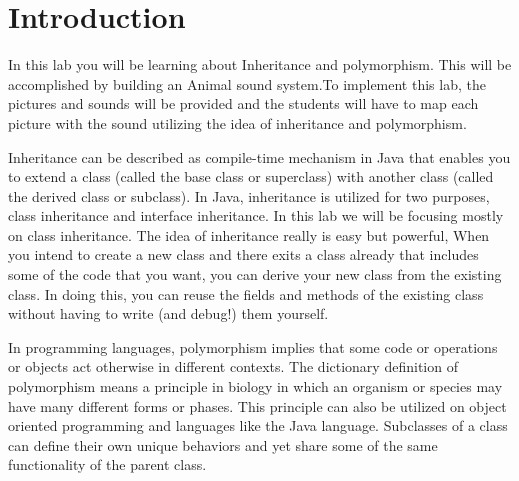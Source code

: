 \section{Introduction}

In this lab you will be learning about Inheritance and polymorphism. This will be accomplished by building an Animal sound system.To implement this lab, the pictures and sounds will be provided and the students will have to map each picture with the sound utilizing the idea of inheritance and polymorphism. 
\begin{flushleft}
Inheritance can be described as compile-time mechanism in Java that enables you to extend a class (called the base class or superclass) with another class (called the derived class or subclass). In Java, inheritance is utilized for two purposes, class inheritance and interface inheritance. In this lab we will be focusing mostly on class inheritance. The idea of inheritance really is easy but powerful, When you intend to create a new class and there exits a class already that includes some of the code that you want, you can derive your new class from the existing class. In doing this, you can reuse the fields and methods of the existing class without having to write (and debug!) them yourself. \end{flushleft}
\begin{flushleft}
In programming languages, polymorphism implies that some code or operations or objects act otherwise in different contexts. The dictionary definition of polymorphism means a principle in biology in which an organism or species may have many different forms or phases. This principle can also be utilized on object oriented programming and languages like the Java language. Subclasses of a class can define their own unique behaviors and yet share some of the same functionality of the parent class.
\end{flushleft}
